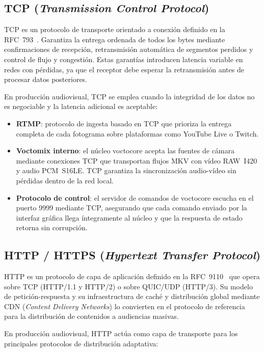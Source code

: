 \subsection{TCP (\textit{Transmission Control Protocol})}

TCP es un protocolo de transporte orientado a conexión definido en la
RFC~793~\cite{rfc793_tcp}. Garantiza la entrega ordenada de todos los bytes mediante
confirmaciones de recepción, retransmisión automática de segmentos perdidos y control
de flujo y congestión. Estas garantías introducen latencia variable en redes con pérdidas,
ya que el receptor debe esperar la retransmisión antes de procesar datos posteriores.

En producción audiovisual, TCP se emplea cuando la integridad de los datos no es
negociable y la latencia adicional es aceptable:

\begin{itemize}
  \item \textbf{RTMP}: protocolo de ingesta basado en TCP que prioriza la entrega
        completa de cada fotograma sobre plataformas como YouTube Live o Twitch.
  \item \textbf{Voctomix interno}: el núcleo voctocore acepta las fuentes de cámara
        mediante conexiones TCP que transportan flujos MKV con vídeo RAW~I420 y audio
        PCM~S16LE. TCP garantiza la sincronización audio-vídeo sin pérdidas dentro
        de la red local.
  \item \textbf{Protocolo de control}: el servidor de comandos de voctocore escucha
        en el puerto 9999 mediante TCP, asegurando que cada comando enviado por la
        interfaz gráfica llega íntegramente al núcleo y que la respuesta de estado
        retorna sin corrupción.
\end{itemize}

\subsection{HTTP / HTTPS (\textit{Hypertext Transfer Protocol})}

HTTP es un protocolo de capa de aplicación definido en la RFC~9110~\cite{rfc9110_http}
que opera sobre TCP (HTTP/1.1 y HTTP/2) o sobre QUIC/UDP (HTTP/3). Su modelo de
petición-respuesta y su infraestructura de caché y distribución global mediante CDN
(\textit{Content Delivery Networks}) lo convierten en el protocolo de referencia para
la distribución de contenidos a audiencias masivas.

En producción audiovisual, HTTP actúa como capa de transporte para los principales
protocolos de distribución adaptativa:

